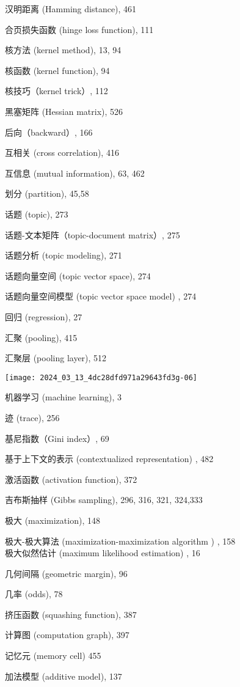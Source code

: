 \documentclass[10pt]{article}
\begin{document}
汉明距离 (Hamming distance), 461

合页损失函数 (hinge loss function), 111

核方法 (kernel method), 13, 94

核函数 (kernel function), 94

核技巧（kernel trick）, 112

黑塞矩阵 (Hessian matrix), 526

后向（backward）, 166

互相关 (cross correlation), 416

互信息 (mutual information), 63, 462

划分 (partition), 45,58

话题 (topic), 273

话题-文本矩阵（topic-document matrix）, 275

话题分析 (topic modeling), 271

话题向量空间 (topic vector space), 274

话题向量空间模型 (topic vector space model) , 274

回归 (regression), 27

汇聚 (pooling), 415

汇聚层 (pooling layer), 512

\begin{center}
\texttt{[image: 2024\_03\_13\_4dc28dfd971a29643fd3g-06]}
\end{center}

机器学习 (machine learning), 3

迹 (trace), 256

基尼指数（Gini index）, 69

基于上下文的表示 (contextualized representation) , 482

激活函数 (activation function), 372

吉布斯抽样 (Gibbs sampling), 296, 316, 321, 324,333

极大 (maximization), 148

极大-极大算法 (maximization-maximization algorithm ) , 158\\
极大似然估计 (maximum likelihood estimation) , 16

几何间隔 (geometric margin), 96

几率 (odds), 78

挤压函数 (squashing function), 387

计算图 (computation graph), 397

记忆元 (memory cell) 455

加法模型 (additive model), 137
\end{document}
